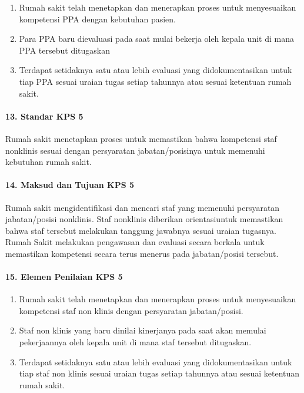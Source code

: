 \documentclass[
]{book}
\providecommand{\tightlist}{%
  \setlength{\itemsep}{0pt}\setlength{\parskip}{0pt}}
\begin{document}
\begin{enumerate}
\def\labelenumi{\alph{enumi}.}
\tightlist
\item
  Rumah sakit telah menetapkan dan menerapkan proses untuk menyesuaikan kompetensi PPA dengan kebutuhan pasien.
\item
  Para PPA baru dievaluasi pada saat mulai bekerja oleh kepala unit di mana PPA tersebut ditugaskan
\item
  Terdapat setidaknya satu atau lebih evaluasi yang didokumentasikan untuk tiap PPA sesuai uraian tugas setiap tahunnya atau sesuai ketentuan rumah sakit.
\end{enumerate}

\hypertarget{standar-kps-5}{%
\paragraph*{13. Standar KPS 5}\label{standar-kps-5}}

Rumah sakit menetapkan proses untuk memastikan bahwa kompetensi staf nonklinis sesuai dengan persyaratan jabatan/posisinya untuk memenuhi kebutuhan rumah sakit.

\hypertarget{maksud-dan-tujuan-kps-5}{%
\paragraph*{14. Maksud dan Tujuan KPS 5}\label{maksud-dan-tujuan-kps-5}}

Rumah sakit mengidentifikasi dan mencari staf yang memenuhi persyaratan jabatan/posisi nonklinis. Staf nonklinis diberikan orientasiuntuk memastikan bahwa staf tersebut melakukan tanggung jawabnya sesuai uraian tugasnya. Rumah Sakit melakukan pengawasan dan evaluasi secara berkala untuk memastikan kompetensi secara terus menerus pada jabatan/posisi tersebut.

\hypertarget{elemen-penilaian-kps-5}{%
\paragraph*{15. Elemen Penilaian KPS 5}\label{elemen-penilaian-kps-5}}

\begin{enumerate}
\def\labelenumi{\alph{enumi}.}
\tightlist
\item
  Rumah sakit telah menetapkan dan menerapkan proses untuk menyesuaikan kompetensi staf non klinis dengan persyaratan jabatan/posisi.
\item
  Staf non klinis yang baru dinilai kinerjanya pada saat akan memulai pekerjaannya oleh kepala unit di mana staf tersebut ditugaskan.
\item
  Terdapat setidaknya satu atau lebih evaluasi yang didokumentasikan untuk tiap staf non klinis sesuai uraian tugas setiap tahunnya atau sesuai ketentuan rumah sakit.
\end{enumerate}
\end{document}
